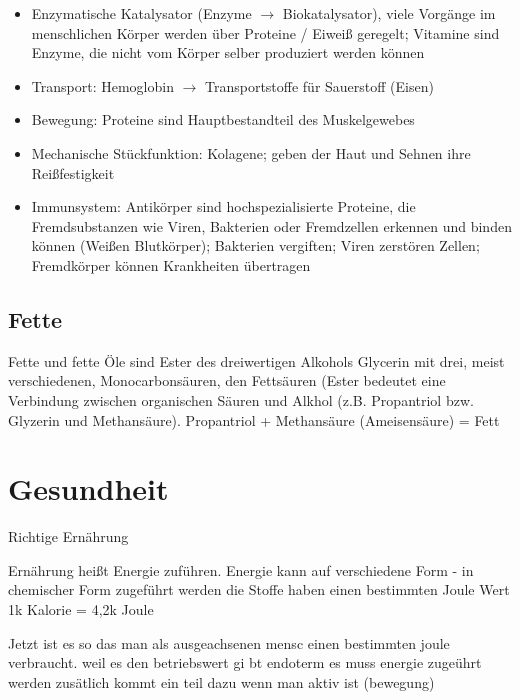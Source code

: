 \documentclass[a4paper]{article}
\begin{document}
\begin{itemize}
\item Enzymatische Katalysator (Enzyme $\rightarrow$ Biokatalysator), viele Vorgänge im menschlichen Körper werden über Proteine / Eiweiß geregelt; Vitamine sind Enzyme, die nicht vom Körper selber produziert werden können

\item Transport: Hemoglobin $\rightarrow$ Transportstoffe für Sauerstoff (Eisen)

\item Bewegung: Proteine sind Hauptbestandteil des Muskelgewebes

\item Mechanische Stückfunktion: Kolagene; geben der Haut und Sehnen ihre Reißfestigkeit

\item Immunsystem: Antikörper sind hochspezialisierte  Proteine, die Fremdsubstanzen wie Viren, Bakterien oder Fremdzellen erkennen und binden können (Weißen Blutkörper); Bakterien vergiften; Viren zerstören Zellen; Fremdkörper können Krankheiten übertragen

\end{itemize}

\subsection{Fette}

Fette und fette Öle sind Ester des dreiwertigen Alkohols Glycerin mit drei, meist verschiedenen, Monocarbonsäuren, den Fettsäuren (Ester bedeutet eine Verbindung zwischen organischen Säuren und Alkhol (z.B. Propantriol bzw. Glyzerin und Methansäure).
\newline
\newline
Propantriol + Methansäure (Ameisensäure) = Fett

\newpage

\section{Gesundheit}

Richtige Ernährung

Ernährung heißt Energie zuführen. 
Energie kann auf verschiedene Form - in chemischer Form zugeführt werden
die Stoffe haben einen bestimmten Joule Wert 1k Kalorie = 4,2k Joule

Jetzt ist es so das man als ausgeachsenen mensc einen bestimmten joule verbraucht. weil es den betriebswert gi bt endoterm es muss energie zugeührt werden zusätlich kommt ein teil dazu wenn man aktiv ist (bewegung) 
\end{document}
